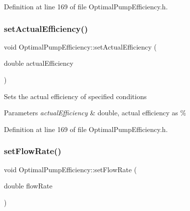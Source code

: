 Definition at line 169 of file Optimal\+Pump\+Efficiency.\+h.

\mbox{\label{class_optimal_pump_efficiency_a539b20c53c7ba6a5983a60d74be4ac9e}} 
\subsubsection{\texorpdfstring{set\+Actual\+Efficiency()}{setActualEfficiency()}\hspace{0.1cm}{\footnotesize\ttfamily [3/3]}}
{\footnotesize\ttfamily void Optimal\+Pump\+Efficiency\+::set\+Actual\+Efficiency (\begin{DoxyParamCaption}\item[{double}]{actual\+Efficiency }\end{DoxyParamCaption})\hspace{0.3cm}{\ttfamily [inline]}}

Sets the actual efficiency of specified conditions 
\begin{DoxyParams}{Parameters}
{\em actual\+Efficiency} & double, actual efficiency as \% \\
\hline
\end{DoxyParams}


Definition at line 169 of file Optimal\+Pump\+Efficiency.\+h.

\mbox{\label{class_optimal_pump_efficiency_a90067b57c559fd3274fb8d6e00f6221d}} 
\subsubsection{\texorpdfstring{set\+Flow\+Rate()}{setFlowRate()}\hspace{0.1cm}{\footnotesize\ttfamily [1/3]}}
{\footnotesize\ttfamily void Optimal\+Pump\+Efficiency\+::set\+Flow\+Rate (\begin{DoxyParamCaption}\item[{double}]{flow\+Rate }\end{DoxyParamCaption})\hspace{0.3cm}{\ttfamily [inline]}}

